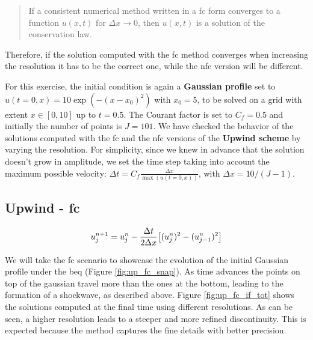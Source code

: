\documentclass[11pt, a4paper]{article}
\begin{document}
\begin{quote}
    If a consistent numerical method written in a \acrshort{fc} form converges to a function \(u(x, t)\) for \(\Delta x \to 0\), then \(u(x, t)\) is a solution of the conservation law.
\end{quote}

\noindent
Therefore, if the solution computed with the \acrshort{fc} method converges when increasing the resolution it has to be the correct one, while the \acrshort{nfc} version will be different.

For this exercise, the initial condition is again a \textbf{Gaussian profile} set to \(u(t = 0, x) = 10 \exp(-(x - x_0)^2)\) with \(x_0 = 5\), to be solved on a grid with extent \(x \in [0, 10]\) up to \(t = 0.5\). The Courant factor is set to \(C_f = 0.5\) and initially the number of points is \(J = 101\). We have checked the behavior of the solutions computed with the \acrshort{fc} and the \acrshort{nfc} versions of the \textbf{Upwind scheme} by varying the resolution. For simplicity, since we knew in advance that the solution doesn't grow in amplitude, we set the time step taking into account the maximum possible velocity: \(\Delta t = C_f \frac{\Delta x}{\max(u(t = 0, x))}\), with \(\Delta x = 10 / (J - 1)\).

\subsection{Upwind - \acrlong{fc}}

\begin{equation} \label{eq:up-fc}
    u^{n+1}_j = u^n_j - \frac{\Delta t}{2 \Delta x} \qty[(u^n_j)^2 - (u^n_{j-1})^2]
\end{equation}

We will take the \acrshort{fc} scenario to showcase the evolution of the initial Gaussian profile under the \acrshort{beq} (Figure \ref{fig:up_fc_snap}). As time advances the points on top of the gaussian travel more than the ones at the bottom, leading to the formation of a shockwave, as described above. Figure \ref{fig:up_fc_if_tot} shows the solutions computed at the final time using different resolutions. As can be seen, a higher resolution leads to a steeper and more refined discontinuity. This is expected because the method captures the fine details with better precision.
\end{document}
